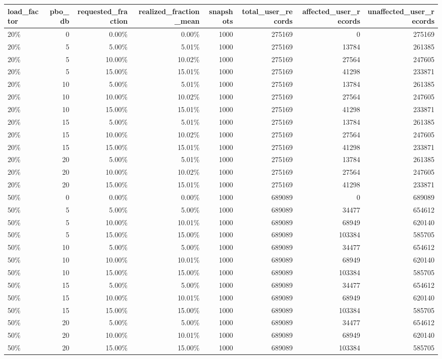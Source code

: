 \begin{tabular}{lrrrrrrr}
\toprule
load\_factor & pbo\_db & requested\_fraction & realized\_fraction\_mean & snapshots & total\_user\_records & affected\_user\_records & unaffected\_user\_records \\
\midrule
20\% & 0 & 0.00\% & 0.00\% & 1000 & 275169 & 0 & 275169 \\
20\% & 5 & 5.00\% & 5.01\% & 1000 & 275169 & 13784 & 261385 \\
20\% & 5 & 10.00\% & 10.02\% & 1000 & 275169 & 27564 & 247605 \\
20\% & 5 & 15.00\% & 15.01\% & 1000 & 275169 & 41298 & 233871 \\
20\% & 10 & 5.00\% & 5.01\% & 1000 & 275169 & 13784 & 261385 \\
20\% & 10 & 10.00\% & 10.02\% & 1000 & 275169 & 27564 & 247605 \\
20\% & 10 & 15.00\% & 15.01\% & 1000 & 275169 & 41298 & 233871 \\
20\% & 15 & 5.00\% & 5.01\% & 1000 & 275169 & 13784 & 261385 \\
20\% & 15 & 10.00\% & 10.02\% & 1000 & 275169 & 27564 & 247605 \\
20\% & 15 & 15.00\% & 15.01\% & 1000 & 275169 & 41298 & 233871 \\
20\% & 20 & 5.00\% & 5.01\% & 1000 & 275169 & 13784 & 261385 \\
20\% & 20 & 10.00\% & 10.02\% & 1000 & 275169 & 27564 & 247605 \\
20\% & 20 & 15.00\% & 15.01\% & 1000 & 275169 & 41298 & 233871 \\
50\% & 0 & 0.00\% & 0.00\% & 1000 & 689089 & 0 & 689089 \\
50\% & 5 & 5.00\% & 5.00\% & 1000 & 689089 & 34477 & 654612 \\
50\% & 5 & 10.00\% & 10.01\% & 1000 & 689089 & 68949 & 620140 \\
50\% & 5 & 15.00\% & 15.00\% & 1000 & 689089 & 103384 & 585705 \\
50\% & 10 & 5.00\% & 5.00\% & 1000 & 689089 & 34477 & 654612 \\
50\% & 10 & 10.00\% & 10.01\% & 1000 & 689089 & 68949 & 620140 \\
50\% & 10 & 15.00\% & 15.00\% & 1000 & 689089 & 103384 & 585705 \\
50\% & 15 & 5.00\% & 5.00\% & 1000 & 689089 & 34477 & 654612 \\
50\% & 15 & 10.00\% & 10.01\% & 1000 & 689089 & 68949 & 620140 \\
50\% & 15 & 15.00\% & 15.00\% & 1000 & 689089 & 103384 & 585705 \\
50\% & 20 & 5.00\% & 5.00\% & 1000 & 689089 & 34477 & 654612 \\
50\% & 20 & 10.00\% & 10.01\% & 1000 & 689089 & 68949 & 620140 \\
50\% & 20 & 15.00\% & 15.00\% & 1000 & 689089 & 103384 & 585705 \\
\bottomrule
\end{tabular}
